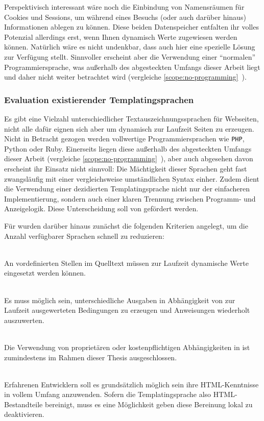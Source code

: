 Perspektivisch interessant wäre noch die Einbindung von Namensräumen für Cookies und Sessions, um während eines Besuchs (oder auch darüber hinaus) Informationen ablegen zu können. Diese beiden Datenspeicher entfalten ihr volles Potenzial allerdings erst, wenn Ihnen dynamisch Werte zugewiesen werden können. Natürlich wäre es nicht undenkbar, dass \idename{} auch hier eine spezielle Lösung zur Verfügung stellt. Sinnvoller erscheint aber die Verwendung einer "`normalen"' Programmiersprache, was außerhalb des abgesteckten Umfangs dieser Arbeit liegt und daher nicht weiter betrachtet wird (vergleiche \ref{scope:no-programming}~).

\subsubsection{Evaluation existierender Templatingsprachen}

Es gibt eine Vielzahl unterschiedlicher Textauszeichnungssprachen für Webseiten, nicht alle dafür eignen sich aber um dynamisch zur Laufzeit Seiten zu erzeugen. Nicht in Betracht gezogen werden vollwertige Programmiersprachen wie \texttt{PHP}, Python oder Ruby. Einerseits liegen diese außerhalb des abgesteckten Umfangs dieser Arbeit (vergleiche \ref{scope:no-programming}~), aber auch abgesehen davon erscheint ihr Einsatz nicht sinnvoll: Die Mächtigkeit dieser Sprachen geht fast zwangsläufig mit einer vergleichsweise umständlichen Syntax einher. Zudem dient die Verwendung einer dezidierten Templatingsprache nicht nur der einfacheren Implementierung, sondern auch einer klaren Trennung zwischen Programm- und Anzeigelogik. Diese Unterscheidung soll von \idename{} gefördert werden.

Für \idename{} wurden darüber hinaus zunächst die folgenden Kriterien angelegt, um die Anzahl verfügbarer Sprachen schnell zu reduzieren:

\begin{description}[noitemsep]
\item[Datenanbindung] \hfill \\
  An vordefinierten Stellen im Quelltext müssen zur Laufzeit dynamische Werte eingesetzt werden können.
\item[Kontrollstrukturen] \hfill \\
  Es muss möglich sein, unterschiedliche Ausgaben in Abhängigkeit von zur Laufzeit ausgewerteten Bedingungen zu erzeugen und Anweisungen wiederholt auszuwerten.
\item[Freie Verfügbarkeit] \hfill \\
  Die Verwendung von proprietären oder kostenpflichtigen Abhängigkeiten in \idename{} ist zumindestens im Rahmen dieser Thesis ausgeschlossen.
\item[Einbettung von reinem HTML] \hfill \\
  Erfahrenen Entwicklern soll es grundsätzlich möglich sein ihre HTML-Kennt\-nisse in vollem Umfang anzuwenden. Sofern die Templatingsprache also HTML-Be\-stand\-teile bereinigt, muss es eine Möglichkeit geben diese Bereinung lokal zu deaktivieren.
\end{description}

